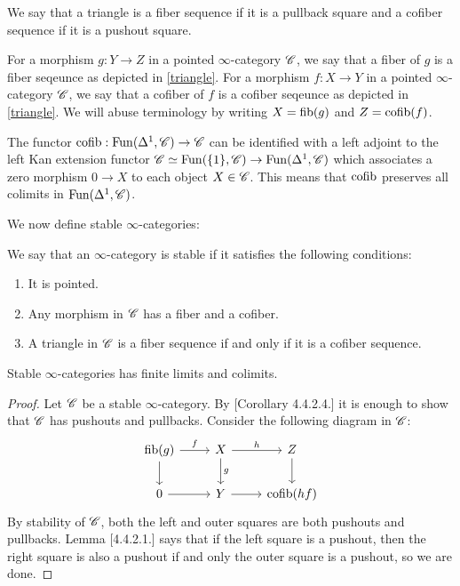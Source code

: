 \documentclass[../../thesis.tex]{subfiles}
\begin{document}
\begin{definition}
    We say that a triangle is a fiber sequence if it is a pullback square and a cofiber sequence if it is a pushout square.
\end{definition}
\begin{definition}[{\cite{HA}[Definition 1.1.1.6.]}]
    For a morphism $g: Y \to Z$ in a pointed $\infty$-category $\mathscr{C}$, we say that a fiber of $g$ is a fiber seqeunce as depicted in \ref{triangle}.
    For a morphism $f: X \to Y$ in a pointed $\infty$-category $\mathscr{C}$, we say that a cofiber of $f$ is a cofiber seqeunce as depicted in \ref{triangle}.
    We will abuse terminology by writing $X = \operatorname{fib}(g)$ and $Z=\operatorname{cofib}(f)$.
\end{definition}
\begin{remark}[{\cite{HA}[Remark 1.1.1.8.]}]
    The functor $\operatorname{cofib}: \mathrm{Fun}(\Delta^1, \mathscr{C})\to \mathscr{C}$ can be identified with a left adjoint to the left Kan extension functor $\mathscr{C} \simeq \mathrm{Fun}(\{1\}, \mathscr{C}) \to \mathrm{Fun}(\Delta^1, \mathscr{C})$ which associates a zero morphism $0 \to X$ to each object $X \in \mathscr{C}$.
    This means that $\operatorname{cofib}$ preserves all colimits in $\mathrm{Fun}(\Delta^1, \mathscr{C})$.
\end{remark}
We now define stable $\infty$-categories:
\begin{definition}[{\cite{HA}[Definition 1.1.1.9.]}]
    We say that an $\infty$-category is stable if it satisfies the following conditions:
    \begin{enumerate}
        \item It is pointed.
        \item Any morphism in $\mathscr{C}$ has a fiber and a cofiber.
        \item A triangle in $\mathscr{C}$ is a fiber sequence if and only if it is a cofiber sequence.
    \end{enumerate}
\end{definition}
\begin{proposition}
    Stable $\infty$-categories has finite limits and colimits.
\end{proposition}
\begin{proof}
    Let $\mathscr{C}$ be a stable $\infty$-category.
    By \cite{HTT}[Corollary 4.4.2.4.] it is enough to show that $\mathscr{C}$ has pushouts and pullbacks.
    Consider the following diagram in $\mathscr{C}$:
    \[\begin{tikzcd}
            {\fib(g)} & X & Z \\
            0 & Y & {\cofib(hf)}
            \arrow["f", from=1-1, to=1-2]
            \arrow[from=2-1, to=2-2]
            \arrow["g", from=1-2, to=2-2]
            \arrow[from=1-1, to=2-1]
            \arrow[from=2-2, to=2-3]
            \arrow["h", from=1-2, to=1-3]
            \arrow[from=1-3, to=2-3]
        \end{tikzcd}\]
    By stability of $\mathscr{C}$, both the left and outer squares are both pushouts and pullbacks.
    Lemma \cite{HTT}[4.4.2.1.] says that if the left square is a pushout, then the right square is also a pushout if and only the outer square is a pushout, so we are done.
\end{proof}
\end{document}
